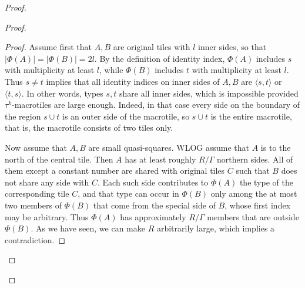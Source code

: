 \documentclass[10pt,a4paper]{amsart}
\newcommand{\pair}[1]{\langle #1\rangle}
\begin{document}
\begin{proof}
\begin{proof}
\begin{proof}
Assume first that $A,B$ are original tiles with $l$ inner sides,
so that $|\Phi(A)|=|\Phi(B)|=2l$. By the definition of identity index,
 $\Phi(A)$ includes $s$ with multiplicity at least $l$, while $\Phi(B)$ includes $t$ with multiplicity at least $l$.
Thus $s\ne t$ implies that all identity indices on inner sides of $A,B$ are $\pair{s,t}$ or $\pair{t,s}$.
In other words, types $s,t$ share all inner sides, which is impossible provided $\tau^k$-macrotiles
are large enough. Indeed, in that case every side on the boundary of the region $s\cup t$ is an
outer side of the macrotile, so $s\cup t$ is the entire macrotile, that is, the macrotile consists
of two tiles only.

Now assume that $A,B$ are small quasi-squares. %
WLOG assume that $A$ is to the north of the central tile. Then $A$ has at least roughly $R/\Gamma$
northern sides. All of them except a constant number are shared with original tiles $C$
such that $B$ does not share any side with $C$. Each such side contributes to $\Phi(A)$ the type of
the corresponding tile $C$, and that type can occur in $\Phi(B)$ only among the at most two members
of $\Phi(B)$ that come from the special side of $B$, whose first index may be arbitrary. Thus
$\Phi(A)$ has approximately $R/\Gamma$
members that are outside $\Phi(B)$. As we have seen, we can make $R$ arbitrarily large, which implies a contradiction.
\end{proof}





\end{proof}
\end{proof}
\end{document}
